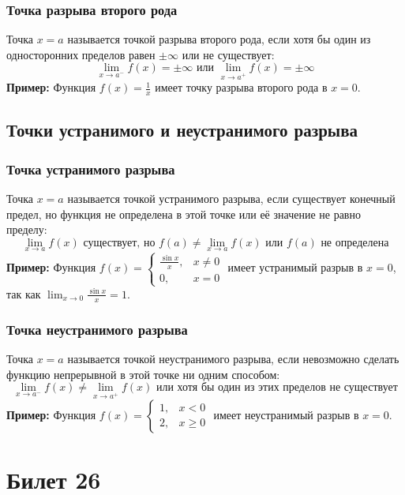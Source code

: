 \documentclass{article}
\begin{document}
\subsubsection*{Точка разрыва второго рода}
Точка $x = a$ называется точкой разрыва второго рода, если хотя бы один из односторонних пределов равен $\pm \infty$ или не существует:
\[
\lim_{x \to a^-} f(x) = \pm \infty \text{ или } \lim_{x \to a^+} f(x) = \pm \infty
\]
\textbf{Пример:} Функция $f(x) = \frac{1}{x}$ имеет точку разрыва второго рода в $x = 0$.

\subsection*{Точки устранимого и неустранимого разрыва}

\subsubsection*{Точка устранимого разрыва}
Точка $x = a$ называется точкой устранимого разрыва, если существует конечный предел, но функция не определена в этой точке или её значение не равно пределу:
\[
\lim_{x \to a} f(x) \text{ существует, но } f(a) \neq \lim_{x \to a} f(x) \text{ или } f(a) \text{ не определена}
\]
\textbf{Пример:} Функция $f(x) = \begin{cases} 
\frac{\sin x}{x}, & x \neq 0 \\
0, & x = 0 
\end{cases}$ имеет устранимый разрыв в $x = 0$, так как $\lim_{x \to 0} \frac{\sin x}{x} = 1$.

\subsubsection*{Точка неустранимого разрыва}
Точка $x = a$ называется точкой неустранимого разрыва, если невозможно сделать функцию непрерывной в этой точке ни одним способом:
\[
\lim_{x \to a^-} f(x) \neq \lim_{x \to a^+} f(x) \text{ или хотя бы один из этих пределов не существует}
\]
\textbf{Пример:} Функция $f(x) = \begin{cases} 
1, & x < 0 \\
2, & x \geq 0 
\end{cases}$ имеет неустранимый разрыв в $x = 0$.

\section{Билет 26}
\end{document}

